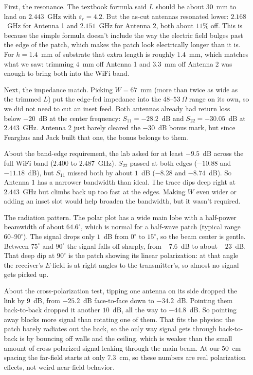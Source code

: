 \documentclass[11pt,letterpaper]{article}
\begin{document}
First, the resonance. The textbook formula said $L$ should be about $30$~mm to land on $2.443$~GHz with $\varepsilon_r = 4.2$. But the as-cut antennas resonated lower: $2.168$~GHz for Antenna 1 and $2.151$~GHz for Antenna 2, both about $11\%$ off. This is because the simple formula doesn't include the way the electric field bulges past the edge of the patch, which makes the patch look electrically longer than it is. For $h = 1.4$~mm of substrate that extra length is roughly $1.4$~mm, which matches what we saw: trimming $4$~mm off Antenna 1 and $3.3$~mm off Antenna 2 was enough to bring both into the WiFi band.

Next, the impedance match. Picking $W = 67$~mm (more than twice as wide as the trimmed $L$) put the edge-fed impedance into the $48$--$53~\Omega$ range on its own, so we did not need to cut an inset feed. Both antennas already had return loss below $-20$~dB at the center frequency: $S_{11} = -28.2$~dB and $S_{22} = -30.05$~dB at $2.443$~GHz. Antenna 2 just barely cleared the $-30$~dB bonus mark, but since Fearghus and Jack built that one, the bonus belongs to them.

About the band-edge requirement, the lab asked for at least $-9.5$~dB across the full WiFi band ($2.400$ to $2.487$~GHz). $S_{22}$ passed at both edges ($-10.88$ and $-11.18$~dB), but $S_{11}$ missed both by about $1$~dB ($-8.28$ and $-8.74$~dB). So Antenna 1 has a narrower bandwidth than ideal. The trace dips deep right at $2.443$~GHz but climbs back up too fast at the edges. Making $W$ even wider or adding an inset slot would help broaden the bandwidth, but it wasn't required.

The radiation pattern. The polar plot has a wide main lobe with a half-power beamwidth of about $64.6^\circ$, which is normal for a half-wave patch (typical range $60$--$90^\circ$). The signal drops only $1$~dB from $0^\circ$ to $15^\circ$, so the beam center is gentle. Between $75^\circ$ and $90^\circ$ the signal falls off sharply, from $-7.6$~dB to about $-23$~dB. That deep dip at $90^\circ$ is the patch showing its linear polarization: at that angle the receiver's $E$-field is at right angles to the transmitter's, so almost no signal gets picked up.

About the cross-polarization test, tipping one antenna on its side dropped the link by $9$~dB, from $-25.2$~dB face-to-face down to $-34.2$~dB. Pointing them back-to-back dropped it another $10$~dB, all the way to $-44.8$~dB. So pointing away blocks more signal than rotating one of them. That fits the physics: the patch barely radiates out the back, so the only way signal gets through back-to-back is by bouncing off walls and the ceiling, which is weaker than the small amount of cross-polarized signal leaking through the main beam. At our $50$~cm spacing the far-field starts at only $7.3$~cm, so these numbers are real polarization effects, not weird near-field behavior.
\end{document}
